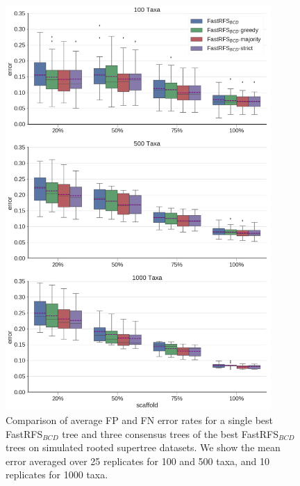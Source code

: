\begin{figure}
  \centering
  \includegraphics[width=0.9\textwidth,height=0.8\textheight, keepaspectratio]{siesta-supp-figs/fastrfs-bcd-consensus-comparison-mult_only}
  \caption[Comparison of  average FP and FN error rates for a single best FastRFS$_{BCD}$ tree and three  consensus trees  on simulated
    rooted supertree datasets.]{Comparison of  average FP and FN error rates for a single best FastRFS$_{BCD}$ tree and three  consensus trees of the best FastRFS$_{BCD}$ trees  on simulated
    rooted supertree datasets. We show the mean error averaged over 25
    replicates for 100 and 500 taxa, and 10 replicates for 1000 taxa.}
  \label{fig:supertree-consensus-comparison-3}
\end{figure}



